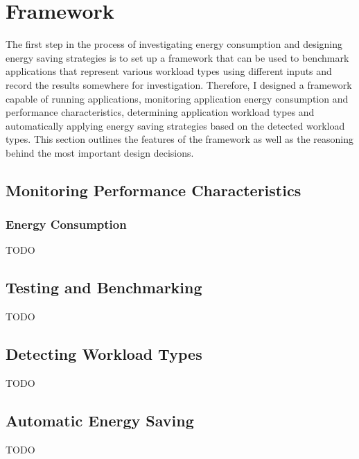 \section{Framework}
	The first step in the process of investigating energy consumption and designing energy saving strategies is to set up a framework that can be used to benchmark applications that represent various workload types using different inputs and record the results somewhere for investigation.
	Therefore, I designed a framework capable of running applications, monitoring application energy consumption and performance characteristics, determining application workload types and automatically applying energy saving strategies based on the detected workload types.
	This section outlines the features of the framework as well as the reasoning behind the most important design decisions.

	\subsection{Monitoring Performance Characteristics}

		\subsubsection{Energy Consumption}
			TODO

	\subsection{Testing and Benchmarking}
		TODO

	\subsection{Detecting Workload Types}
		TODO

	\subsection{Automatic Energy Saving}
		TODO